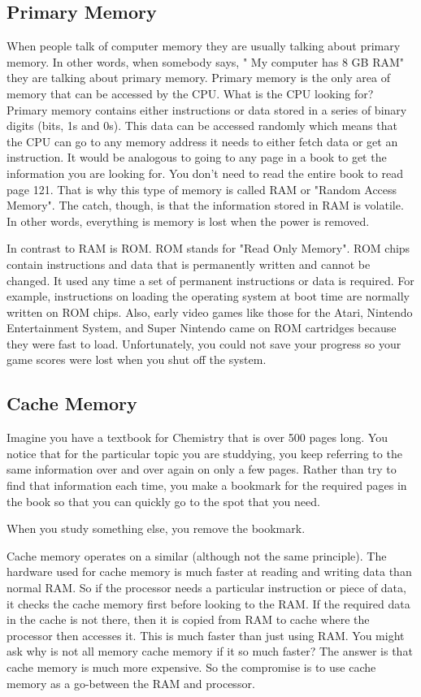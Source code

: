 \subsection*{Primary Memory}
When people talk of computer memory they are usually talking about primary memory. In other words, when somebody says, " My computer has 8 GB RAM" they are talking about primary memory. Primary memory is the only area of memory that can be accessed by the CPU. What is the CPU looking for? Primary memory contains either instructions or data stored in a series of binary digits (bits, 1s and 0s). This data can be accessed randomly which means that the CPU can go to any memory address it needs to either fetch data or get an instruction. It would be analogous to going to any page in a book to get the information you are looking for. You don't need to read the entire book to read page 121. That is why this type of memory is called RAM or "Random Access Memory". The catch, though, is that the information stored in RAM is volatile. In other words, everything is memory is lost when the power is removed.

In contrast to RAM is ROM. ROM stands for "Read Only Memory". ROM chips contain instructions and data that is permanently written and cannot be changed. It used any time a set of permanent instructions or data is required. For example, instructions on loading the operating system at boot time are normally written on ROM chips. Also, early video games like those for the Atari, Nintendo Entertainment System, and Super Nintendo came on ROM cartridges because they were fast to load. Unfortunately, you could not save your progress so your game scores were lost when you shut off the system.

\subsection*{Cache Memory}
Imagine you have a textbook for Chemistry that is over 500 pages long. You notice that for the particular topic you are studdying, you keep referring to the same information over and over again on only a few pages. Rather than try to find that information each time, you make a bookmark for the required pages in the book so that you can quickly go to the spot that you need.

When you study something else, you remove the bookmark.

Cache memory operates on a similar (although not the same principle). The hardware used for cache memory is much faster at reading and writing data than normal RAM. So if the processor needs a particular instruction or piece of data, it checks the cache memory first before looking to the RAM. If the required data in the cache is not there, then it is copied from RAM to cache where the processor then accesses it. This is much faster than just using RAM. You might ask why is not all memory cache memory if it so much faster? The answer is that cache memory is much more expensive. So the compromise is to use cache memory as a go-between the RAM and processor.

